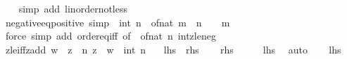 \begin{isabellebody}
%
\isadelimproof
\ \ %
\endisadelimproof
%
\isatagproof
{}\isamarkupfalse%
\ {\isacharparenleft}{\kern0pt}simp\ add{\isacharcolon}{\kern0pt}\ linorder{\isacharunderscore}{\kern0pt}not{\isacharunderscore}{\kern0pt}less{\isacharparenright}{\kern0pt}%
\endisatagproof
{\isafoldproof}%
%
\isadelimproof
\isanewline
%
\endisadelimproof
\isanewline
{}\isamarkupfalse%
\ negative{\isacharunderscore}{\kern0pt}eq{\isacharunderscore}{\kern0pt}positive\ {\isacharbrackleft}{\kern0pt}simp{\isacharbrackright}{\kern0pt}{\isacharcolon}{\kern0pt}\ {\isachardoublequoteopen}{\isacharminus}{\kern0pt}\ int\ n\ {\isacharequal}{\kern0pt}\ of{\isacharunderscore}{\kern0pt}nat\ m\ {\isasymlongleftrightarrow}\ n\ {\isacharequal}{\kern0pt}\ {}\ {\isasymand}\ m\ {\isacharequal}{\kern0pt}\ {}{\isachardoublequoteclose}\isanewline
%
\isadelimproof
\ \ %
\endisadelimproof
%
\isatagproof
{}\isamarkupfalse%
\ {\isacharparenleft}{\kern0pt}force\ simp\ add{\isacharcolon}{\kern0pt}\ order{\isacharunderscore}{\kern0pt}eq{\isacharunderscore}{\kern0pt}iff\ {\isacharbrackleft}{\kern0pt}of\ {\isachardoublequoteopen}{\isacharminus}{\kern0pt}\ of{\isacharunderscore}{\kern0pt}nat\ n{\isachardoublequoteclose}{\isacharbrackright}{\kern0pt}\ int{\isacharunderscore}{\kern0pt}zle{\isacharunderscore}{\kern0pt}neg{\isacharparenright}{\kern0pt}%
\endisatagproof
{\isafoldproof}%
%
\isadelimproof
\isanewline
%
\endisadelimproof
\isanewline
{}\isamarkupfalse%
\ zle{\isacharunderscore}{\kern0pt}iff{\isacharunderscore}{\kern0pt}zadd{\isacharcolon}{\kern0pt}\ {\isachardoublequoteopen}w\ {\isasymle}\ z\ {\isasymlongleftrightarrow}\ {\isacharparenleft}{\kern0pt}{\isasymexists}n{\isachardot}{\kern0pt}\ z\ {\isacharequal}{\kern0pt}\ w\ {\isacharplus}{\kern0pt}\ int\ n{\isacharparenright}{\kern0pt}{\isachardoublequoteclose}\isanewline
\ \ {\isacharparenleft}{\kern0pt}\ {\isachardoublequoteopen}{\isacharquery}{\kern0pt}lhs\ {\isasymlongleftrightarrow}\ {\isacharquery}{\kern0pt}rhs{\isachardoublequoteclose}{\isacharparenright}{\kern0pt}\isanewline
%
\isadelimproof
%
\endisadelimproof
%
\isatagproof
{}\isamarkupfalse%
\isanewline
\ \ \isamarkupfalse%
\ {\isacharquery}{\kern0pt}rhs\isanewline
\ \ \isamarkupfalse%
\ \isamarkupfalse%
\ {\isacharquery}{\kern0pt}lhs\ \isamarkupfalse%
\ auto\isanewline
{}\isamarkupfalse%
\isanewline
\ \ \isamarkupfalse%
\ {\isacharquery}{\kern0pt}lhs\isanewline
\ \ \isamarkupfalse%

\end{isabellebody}
